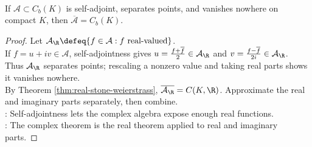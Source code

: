 \begin{theorem} \label{thm:complex-stone-weierstrass} \\
If $\mathcal{A}\subset C_b(K)$ is self-adjoint, separates points, and vanishes nowhere on compact $K$, then $\overline{\mathcal{A}}=C_b(K)$.
\begin{proof}
Let $\mathcal{A}_{\R}\defeq\{f\in\mathcal{A}:f\text{ real-valued}\}$.\\
If $f=u+iv\in\mathcal{A}$, self-adjointness gives $u=\frac{f+\overline{f}}{2}\in\mathcal{A}_{\R}$ and $v=\frac{f-\overline{f}}{2i}\in\mathcal{A}_{\R}$.\\
Thus $\mathcal{A}_{\R}$ separates points; rescaling a nonzero value and taking real parts shows it vanishes nowhere.\\
By Theorem \ref{thm:real-stone-weierstrass}, $\overline{\mathcal{A}_{\R}}=C(K,\R)$. Approximate the real and imaginary parts separately, then combine.\\
: Self-adjointness lets the complex algebra expose enough real functions.\\
: The complex theorem is the real theorem applied to real and imaginary parts.
\end{proof}
\end{theorem}

